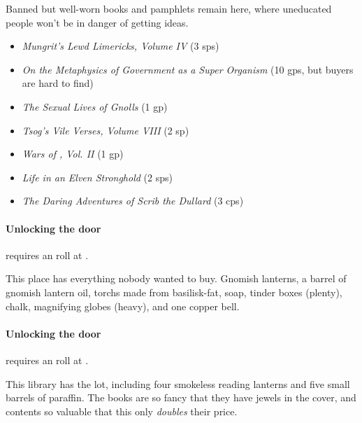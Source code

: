 \begin{multicols}{2}



Banned but well-worn books and pamphlets remain here, where uneducated people won't be in danger of getting ideas.

\begin{itemize}
  \item
  \textit{Mungrit's Lewd Limericks, Volume IV} (3 \glspl{sp})
  \item
  \textit{On the Metaphysics of Government as a Super Organism} (10 \glspl{gp}, but buyers are hard to find)
  \item
  \textit{The Sexual Lives of Gnolls} (1 \gls{gp})
  \item
  \textit{Tsog's Vile Verses, Volume VIII} (2 sp)
  \item
  \textit{Wars of , Vol. II} (1 \gls{gp})
  \item
  \textit{Life in an Elven Stronghold} (2 \glspl{sp})
  \item
  \textit{The Daring Adventures of Scrib the Dullard} (3 \glspl{cp})
\end{itemize}

\paragraph{Unlocking the door}
requires an  roll at \tn[13].


This place has everything nobody wanted to buy.
Gnomish lanterns, a barrel of gnomish lantern oil, \glspl{torch} made from \gls{basilisk}-fat, soap, tinder boxes (plenty), chalk, magnifying globes (heavy), and one copper bell.

\paragraph{Unlocking the door}
requires an  roll at \tn[13].


This library has the lot, including four smokeless reading lanterns and five small barrels of paraffin.
The books are so fancy that they have jewels in the cover, and contents so valuable that this only \emph{doubles} their price.



\end{multicols}
